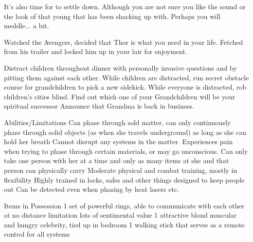 \documentclass[char]{LRSguildcamp1}
\begin{document}
It's also time for \cYoungest {} to settle down. Although you are not sure you like the sound or the look of that young \cYS{\hero} that \cYoungest{} has been shacking up with. Perhaps you will meddle... a bit. 

Watched the Avengers, decided that Thor is what you need in your life. Fetched \cChrisHemsworth{\intro} from his trailer and locked him up in your lair for enjoyment.

\begin{itemz}[Goals]
	\item 
	Distract children throughout dinner with personally invasive questions and by pitting them against each other. 
	While children are distracted, run secret obstacle course for grandchildren to pick a new sidekick. 
	While everyone is distracted, rob children’s cities blind. 
	Find out which one of your Grandchildren will be your spiritual successor 
	Announce that Grandma is back in business. 
	
\end{itemz}

\begin{itemz}[Notes]
	\item 
	
	Abilities/Limitations 
	Can phase through sold matter, can only continuously phase through solid objects (as when she travels underground) as long as she can hold her breath 
	Cannot disrupt any systems in the matter. 
	Experiences pain when trying to phase through certain materials, or may go unconscious. 
	Can only take one person with her at a time and only as many items at she and that person can physically carry 
	Moderate physical and combat training, mostly in flexibility 
	Highly trained in locks, safes and other things designed to keep people out 
	Can be detected even when phasing by heat lasers etc. 
	
	Items in Possession
	1 set of powerful rings, able to communicate with each other at no distance limitation lots of sentimental value 
	1 attractive blond muscular and hungry celebrity, tied up in bedroom 
	1 walking stick that serves as a remote control for all systems 
	
\end{itemz}
\end{document}
